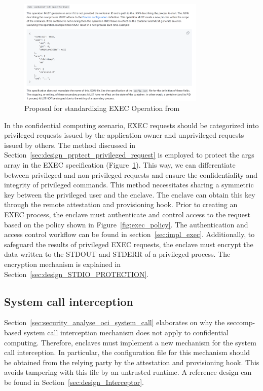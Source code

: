 \begin{figure}[!htb]
    \centering
    \includegraphics[width=0.8\textwidth]{images/exec_propose.png}
    \caption[Proposal for standardizing EXEC operation]{Proposal for standardizing EXEC Operation from~\cite*{exec_proposal}}
    \label{fig:exec_propose}
\end{figure}
 
In the confidential computing scenario, EXEC requests should be categorized into privileged requests issued by the application owner and unprivileged requests issued by others. The method discussed in Section~\ref{sec:design_prptect_privileged_request} is employed to protect the args array in the EXEC specification (Figure~\ref{fig:exec_propose}). This way, 
we can differentiate between privileged and non-privileged requests and ensure the confidentiality and integrity of privileged commands. This method necessitates sharing a symmetric key between the privileged user and the enclave. The enclave can obtain this key through the remote attestation and provisioning hook. Prior to creating an EXEC process,
the enclave must authenticate and control access to the request based on the policy shown in Figure~\ref{fig:exec_policy}. The authentication and access control workflow can be found in section~\ref{sec:impl_exec}. Additionally, to safeguard the results of privileged EXEC requests, the enclave must encrypt the data written to the STDOUT and STDERR of a 
privileged process. The encryption mechanism is explained in Section~\ref{sec:design_STDIO_PROTECTION}.


\subsection{System call interception}
Section~\ref{sec:security_analyse_oci_system_call} elaborates on why the seccomp-based system call interception mechanism does not apply to confidential computing. Therefore, enclaves must implement a new mechanism for the system call interception. In particular, the configuration file for this mechanism should be obtained from the relying party by the attestation and provisioning hook. 
This avoids tampering with this file by an untrusted runtime. A reference design can be found in Section~\ref{sec:design_Interceptor}.



